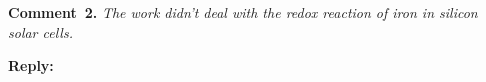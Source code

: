 \documentclass[a4paper,fleqn]{cas-sc}
\begin{document}
%
%

\vspace{1cm}
\noindent
\textcolor[rgb]{0.00,0.50,1.00}{\textbf{Comment~2.}}
\emph{The work didn't deal with the redox reaction of iron in silicon solar cells.}

\noindent
\textcolor[rgb]{0.51,0.00,0.00}{\textbf{Reply:}}
\end{document}
